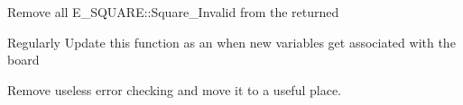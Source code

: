 
\begin{DoxyRefList}
\item[Member \mbox{\hyperlink{structS__BOARD_aee4e1de800c7deabd26e1d650e455744}{S\+\_\+\+BOARD\+::Get\+Square\+List}} (U8 piece)]\label{todo__todo000003}%
%
Remove all E\+\_\+\+SQUARE\+::\+Square\+\_\+\+Invalid from the returned  
\item[Member \mbox{\hyperlink{structS__BOARD_aa3633793b7953270f505a302ffc18e25}{S\+\_\+\+BOARD\+::Reset\+Board}} ()]\label{todo__todo000002}%
%
Regularly Update this function as an when new variables get associated with the board 
\item[Member \mbox{\hyperlink{structS__BOARD_a6b80099a2ea90dcfdd4b487871dc710c}{S\+\_\+\+BOARD\+::Set\+Piece\+On\+Square}} (U8 sq120, E\+\_\+\+PIECE piece, std\+::string mode=\char`\"{}normal\char`\"{})]\label{todo__todo000001}%
%
Remove useless error checking and move it to a useful place.
\end{DoxyRefList}